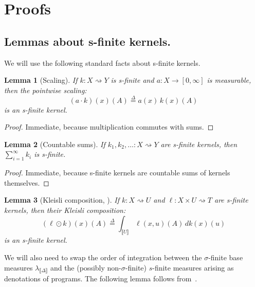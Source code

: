 \documentclass[preprint]{uai2026} %
\newtheorem{lemma}{Lemma}
\newcommand{\sem}[1]{\llbracket #1 \rrbracket}
\newcommand{\kto}{\rightsquigarrow}
\newcommand{\df}{\overset{\Delta}{=}}
\newcommand{\datavar}[1]{\mathtt{#1}}
\begin{document}
\newpage
\section{Proofs}\label{sec:proofs}

\subsection{Lemmas about s-finite kernels.}

We will use the following standard facts about s-finite kernels.
\begin{lemma}[Scaling]\label{lemma:S1}
If $k:X\kto Y$ is s-finite and $a:X\to[0,\infty]$ is measurable, then the pointwise scaling:
\[
(a\cdot k)(x)(A)\df a(x)\,k(x)(A)
\]
is an s-finite kernel.
\end{lemma}
\begin{proof}
Immediate, because multiplication commutes with sums.
\end{proof}
\begin{lemma}[Countable sums]\label{lemma:kernels-sum}
If $k_1,k_2,\ldots:X\kto Y$ are s-finite kernels, then $\sum_{i=1}^\infty k_i$ is s-finite.  
\end{lemma}
\begin{proof}
    Immediate, because s-finite kernels are countable sums of kernels themselves.
\end{proof}
\begin{lemma}[Kleisli composition, {\cite[Lemma 3]{statonCommutativeSemanticsProbabilistic2017b}}]\label{lemma:S3}
If $k:X\kto U$ and $\ell:X\times U\kto T$ are s-finite kernels, then their Kleisli composition:
\[
(\ell\odot k)(x)(A)\df \int_{\sem{U}} \ell(x,u)(A)\,dk(x)(u)
\]
is an s-finite kernel.    
\end{lemma}

We will also need to swap the order of integration between the $\sigma$-finite base measures
$\lambda_{\sem{\Delta}}$ and the (possibly non-$\sigma$-finite) $s$-finite measures
arising as denotations of programs. The following lemma follows from~\cite[Proposition 5]{statonCommutativeSemanticsProbabilistic2017b}.
\end{document}
